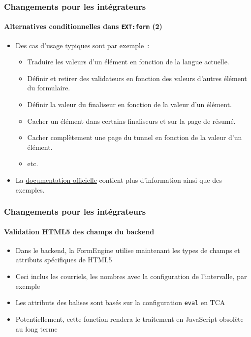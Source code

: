 \begin{frame}[fragile]
	\frametitle{Changements pour les intégrateurs}
	\framesubtitle{Alternatives conditionnelles dans \texttt{EXT:form} (2)}

	\begin{itemize}
		\item Des cas d'usage typiques sont par exemple~:

			\begin{itemize}
				\item Traduire les valeurs d'un élément en fonction de la langue actuelle.
				\item Définir et retirer des validateurs en fonction des valeurs d'autres
					élément du formulaire.
				\item Définir la valeur du finaliseur en fonction de la valeur d'un élément.
				\item Cacher un élément dans certains finaliseurs et sur la page de résumé.
				\item Cacher complètement une page du tunnel en fonction de la valeur d'un élément.
				\item etc.
			\end{itemize}

		\item La \href{https://docs.typo3.org/typo3cms/extensions/form}{documentation officielle}
			contient plus d'information ainsi que des exemples.

	\end{itemize}

\end{frame}


\begin{frame}[fragile]
	\frametitle{Changements pour les intégrateurs}
	\framesubtitle{Validation HTML5 des champs du backend}

	\begin{itemize}
		\item Dans le backend, la FormEngine utilise maintenant les types de champs
		    et attributs spécifiques de HTML5
		\item Ceci inclus les courriels, les nombres avec la configuration de
			l'intervalle, par exemple
		\item Les attributs des balises sont basés sur la configuration \texttt{eval} en TCA
		\item Potentiellement, cette fonction rendera le traitement en JavaScript obsolète
			au long terme
	\end{itemize}

\end{frame}

